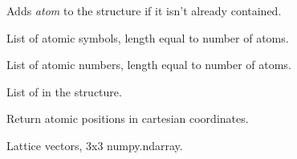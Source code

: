 \documentclass[letterpaper,10pt,english]{sphinxmanual}
\begin{document}
\begin{fulllineitems}
\begin{fulllineitems}
\label{models:qmpy.Structure.add_atom}
Adds \emph{atom} to the structure if it isn't already contained.

\end{fulllineitems}


\begin{fulllineitems}
\label{models:qmpy.Structure.atom_types}
List of atomic symbols, length equal to number of atoms.

\end{fulllineitems}


\begin{fulllineitems}
\label{models:qmpy.Structure.atomic_numbers}
List of atomic numbers, length equal to number of atoms.

\end{fulllineitems}


\begin{fulllineitems}
\label{models:qmpy.Structure.atoms}
List of  in the structure.

\end{fulllineitems}


\begin{fulllineitems}
\label{models:qmpy.Structure.cartesian_coords}
Return atomic positions in cartesian coordinates.

\end{fulllineitems}


\begin{fulllineitems}
\label{models:qmpy.Structure.cell}
Lattice vectors, 3x3 numpy.ndarray.

\end{fulllineitems}



\end{fulllineitems}
\end{document}
